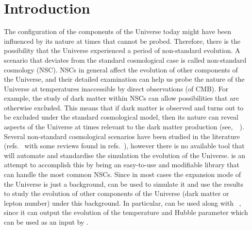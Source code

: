 \documentclass[11pt,a4paper]{article}
\begin{document}
\section{Introduction}\label{sec:intro}
\setcounter{equation}{0}
%
The configuration of the components of the Universe today might have been influenced by its nature at times that cannot be probed. Therefore, there is the possibility that the Universe experienced a period of non-standard evolution. A scenario that deviates from the standard cosmological case is called non-standard cosmology (NSC). 
%
NSCs in general affect the evolution of other components of the Universe, and their detailed examination can help us probe the nature of the Universe at temperatures inaccessible by direct observations (\eg of CMB). For example, the study of dark matter within NSCs can allow possibilities that are otherwise excluded. This means that if dark matter is observed and turns out to be excluded under the standard cosmological model, then its nature can reveal aspects of the Universe at times relevant to the dark matter production (see,~\eg~\cite{McDonald:1989jd,DEramo:2017gpl,Redmond:2017tja,DEramo:2017ecx,Bernal:2020bfj,Arias:2020qty,Arias:2021rer,Barman:2021ifu,Dienes:2021woi,Banerjee:2022fiw,Hardy:2018bph,Bernal:2018kcw,Arias:2019uol,Allahverdi:2019jsc,Bernal:2019mhf,Cosme:2020mck}). 
%
Several non-standard cosmological scenarios have been studied in the literature (\eg refs.~\cite{Vilenkin:1982wt,Coughlan:1983ci,Ratra:1987rm,Giudice:2000ex,Gardner:2004in,Dalianis:2018afb} with some reviews found in refs.~\cite{Tsujikawa:2013fta,Allahverdi:2020bys}), however there is no available tool that will automate and standardise the simulation the evolution of the Universe. \nsc is an attempt to accomplish this by being an easy-to-use and modifiable \CPP library that can handle the most common NSCs. 
%
Since in most cases the expansion mode of the Universe is just a background, \nsc can be used to simulate it and use the results to study the evolution of other components of the Universe (\eg dark matter or lepton number) under this background. 
%
In particular, \nsc can be used along with \mimes~\cite{Karamitros:2021nxi}, since it can output the evolution of the temperature and Hubble parameter which can be used as an input by \mimes.
\end{document}
